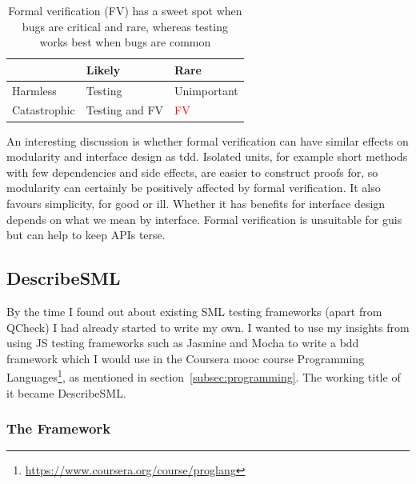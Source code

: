 \documentclass[11pt]{article}
\begin{document}
\begin{table}
  \centering
    \begin{tabular}{ l | l l}
    & Likely & Rare \\ \hline
    Harmless & Testing & Unimportant \\
    Catastrophic & Testing and FV & \textcolor{red}{FV} \\
    \end{tabular}
  \caption{Formal verification (FV) has a sweet spot when bugs are critical and rare, whereas testing works best when bugs are common}
  \label{tab:fvt2}
\end{table}

An interesting discussion is whether formal verification can have similar effects on modularity and interface design as \gls{tdd}. Isolated units, for example short methods with few dependencies and side effects, are easier to construct proofs for, so modularity can certainly be positively affected by formal verification. It also favours simplicity, for good or ill. Whether it has benefits for interface design depends on what we mean by interface. Formal verification is unsuitable for \glspl{gui} but can help to keep APIs terse.


\subsection{DescribeSML}
\label{subsec:describesml}

By the time I found out about existing SML testing frameworks (apart from QCheck) I had already started to write my own. I wanted to use my insights from using JS testing frameworks such as Jasmine and Mocha to write a \gls{bdd} framework which I would use in the Coursera \gls{mooc} course Programming Languages\footnote{\url{https://www.coursera.org/course/proglang}}, as mentioned in section~\ref{subsec:programming}. The working title of it became DescribeSML.

\subsubsection{The Framework}
\end{document}
